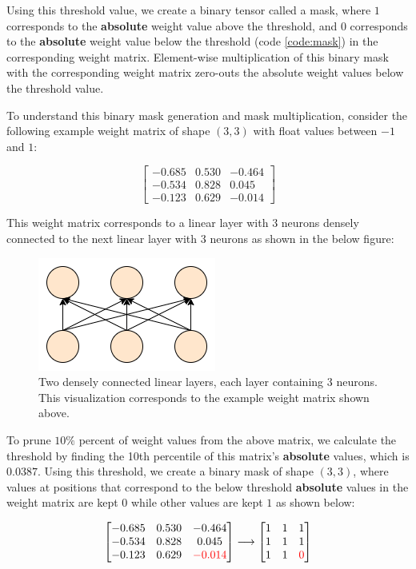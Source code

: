 Using this threshold value, we create a binary tensor called a mask, where $1$ corresponds to the \textbf{absolute} weight value above the threshold, and $0$ corresponds to the \textbf{absolute} weight value below the threshold (code \ref{code:mask}) in the corresponding weight matrix. Element-wise multiplication of this binary mask with the corresponding weight matrix zero-outs the absolute weight values below the threshold value.

To understand this binary mask generation and mask multiplication, consider the following example weight matrix of shape $(3, 3)$ with float values between $-1$ and $1$:

\[
\begin{bmatrix}
    -0.685 & 0.530 & -0.464 \\
    -0.534 & 0.828 &  0.045 \\
    -0.123 & 0.629 & -0.014
\end{bmatrix}
\]

This weight matrix corresponds to a linear layer with 3 neurons densely connected to the next linear layer with 3 neurons as shown in the below figure:

\begin{figure}[h]
	\centering
	\includegraphics[width=0.3\linewidth]{images/experiments/three_neuron.png}
	\caption[Two densely connected linear layers]%
	{Two densely connected linear layers, each layer containing 3 neurons. This visualization corresponds to the example weight matrix shown above.}
	\label{fig:three_neuron}
\end{figure}

To prune $10\%$ percent of weight values from the above matrix, we calculate the threshold by finding the 10th percentile of this matrix's \textbf{absolute} values, which is $0.0387$. Using this threshold, we create a binary mask of shape $(3, 3)$, where values at positions that correspond to the below threshold \textbf{absolute} values in the weight matrix are kept $0$ while other values are kept $1$ as shown below:

\[
\begin{bmatrix}
    -0.685 & 0.530 & -0.464 \\
    -0.534 & 0.828 &  0.045 \\
    -0.123 & 0.629 & \textcolor{red}{-0.014}
\end{bmatrix}
\longrightarrow
\begin{bmatrix}
    1 & 1 & 1 \\
    1 & 1 &  1 \\
    1 & 1 & \textcolor{red}{0}
\end{bmatrix}
\]

